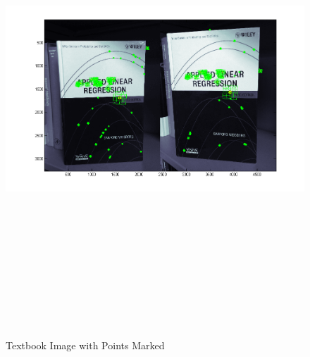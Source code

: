 \documentclass[11pt,psfig]{article}
\begin{document}
\begin{figure}[H]
\centering
\includegraphics[height=7in]{book_prob2Points2.png}
\caption{Textbook Image with Points Marked}
\label{p2b}
\end{figure}
\end{document}
